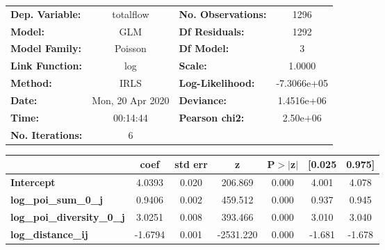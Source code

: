 \begin{center}
\begin{tabular}{lclc}
\toprule
\textbf{Dep. Variable:}            &    totalflow     & \textbf{  No. Observations:  } &      1296    \\
\textbf{Model:}                    &       GLM        & \textbf{  Df Residuals:      } &      1292    \\
\textbf{Model Family:}             &     Poisson      & \textbf{  Df Model:          } &         3    \\
\textbf{Link Function:}            &       log        & \textbf{  Scale:             } &     1.0000   \\
\textbf{Method:}                   &       IRLS       & \textbf{  Log-Likelihood:    } & -7.3066e+05  \\
\textbf{Date:}                     & Mon, 20 Apr 2020 & \textbf{  Deviance:          } &  1.4516e+06  \\
\textbf{Time:}                     &     00:14:44     & \textbf{  Pearson chi2:      } &   2.50e+06   \\
\textbf{No. Iterations:}           &        6         & \textbf{                     } &              \\
\bottomrule
\end{tabular}
\begin{tabular}{lcccccc}
                                   & \textbf{coef} & \textbf{std err} & \textbf{z} & \textbf{P$> |$z$|$} & \textbf{[0.025} & \textbf{0.975]}  \\
\midrule
\textbf{Intercept}                 &       4.0393  &        0.020     &   206.869  &         0.000        &        4.001    &        4.078     \\
\textbf{log\_poi\_sum\_0\_j}       &       0.9406  &        0.002     &   459.512  &         0.000        &        0.937    &        0.945     \\
\textbf{log\_poi\_diversity\_0\_j} &       3.0251  &        0.008     &   393.466  &         0.000        &        3.010    &        3.040     \\
\textbf{log\_distance\_ij}         &      -1.6794  &        0.001     & -2531.220  &         0.000        &       -1.681    &       -1.678     \\
\bottomrule
\end{tabular}
\end{center}
